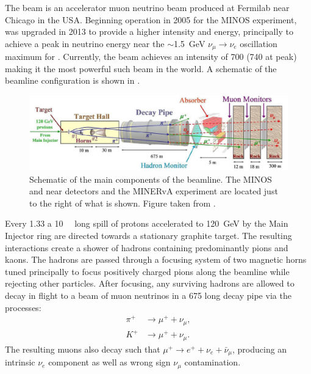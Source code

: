 The \numi beam is an accelerator muon neutrino beam produced at Fermilab near Chicago in the USA.
Beginning operation in 2005 for the MINOS experiment, \numi was upgraded in 2013 to provide a
higher intensity and energy, principally to achieve a peak in neutrino energy near the
$\sim$\SI{1.5}{\GeV} $\nu_{\mu}\rightarrow\nu_{e}$ oscillation maximum for \nova. Currently, the
\numi beam achieves an intensity of \SI{700}{} (\SI{740}{} at peak) making it
the most powerful such beam in the world. A schematic of the \numi beamline configuration is shown
in .

\begin{figure} %
    \includegraphics[width=\textwidth]{diagrams/4-chips/numi_beam.pdf}
    \caption[Schematic of the main components of the \numi beamline]
    {Schematic of the main components of the \numi beamline. The MINOS and \nova near detectors
        and the MINERvA experiment are located just to the right of what is shown. Figure taken
        from .}
    \label{fig:numi_beam}
\end{figure}

Every \SI{1.33}{} a \SI{10}{\micro{}} long spill of protons accelerated to
\SI{120}{\GeV} by the Main Injector ring are directed towards a stationary graphite target. The
resulting interactions create a shower of hadrons containing predominantly pions and kaons. The
hadrons are passed through a focusing system of two magnetic horns tuned principally to focus
positively charged pions along the beamline while rejecting other particles. After focusing, any
surviving hadrons are allowed to decay in flight to a beam of muon neutrinos in a
\SI{675}{} long decay pipe via the processes:
\begin{align} %
    \pi^{+} & \rightarrow\mu^{+}+\nu_{\mu}, \label{eq:pi_decays}   \\
    K^{+}   & \rightarrow\mu^{+}+\nu_{\mu}. \label{eq:kaon_decays}
\end{align}
The resulting muons also decay such that $\mu^{+}\rightarrow e^{+}+\nu_{e}+\bar{\nu}_{\mu}$,
producing an intrinsic $\nu_{e}$ component as well as wrong sign $\nu_{\mu}$ contamination.

